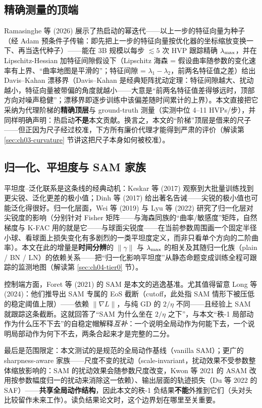 \subsection{精确测量的顶端}
\label{sec:ch02-exact}

Ramasinghe 等 (2026) 展示了热启动的幂迭代——以上一步的特征向量为种子（经 Adam
预条件子传输：即先把上一步的特征向量按优化器的坐标缩放变换一下、再当迭代种子）——能在 3B 规模以每步 $\lesssim 5$ 次 HVP 跟踪精确 $\lambda_{\max}$，并在
Lipschitz-Hessian 加特征间隙假设下（Lipschitz 海森 = 假设曲率随参数的变化速率有上界、“曲率地图是平滑的”；特征间隙 = $\lambda_1-\lambda_2$，前两名特征值之差）给出 Davis--Kahan
漂移界（Davis–Kahan 是经典矩阵扰动定理：特征间隙越大、扰动越小，特征向量被带偏的角度就越小——大意是“前两名特征值差得够远时，顶部方向对噪声稳健”；漂移界即逐步训练中该偏差随时间累计的上界）。本文直接把它采纳为代理阶梯的\textbf{精确顶层}与 ground-truth 测量（实测中位
4--11
HVPs/步），并同样明确声明：热启动\textbf{不是}本文贡献。换言之，本文的“阶梯”顶层是借来的尺子——但正因为尺子经过校准，下方所有廉价代理才能得到严肃的评价（解读第
\ref{sec:ch03-curvature} 节讲这把尺子本身如何被校准）。

\subsection{归一化、平坦度与 SAM 家族}
\label{sec:ch02-flatness}

平坦度--泛化联系是这条线的经典动机：Keskar 等 (2017)
观察到大批量训练找到更尖锐、泛化更差的极小值；Dinh 等 (2017)
给出著名告诫——尖锐的极小值也可能泛化得很好。归一化层面，Wei 等 (2019) 与 Lyu 等
(2022) 研究了归一化层对尖锐度的影响（分别针对 Fisher
矩阵——与海森同族的“曲率/敏感度”矩阵，自然梯度与 K-FAC 用的就是它——与球面尖锐度——在当前参数周围画一个固定半径小球、看球面上损失变化有多剧烈的一类平坦度定义，而非只看单个方向的二阶曲率）。本文在此的增量是\textbf{时间分辨}的 $\|\gamma\|$ 与 $\lambda_{\max}$
的相关及其随归一化族（plain / BN /
LN）的依赖关系——把“归一化影响平坦度”从静态命题变成训练全程可跟踪的监测地图（解读第
\ref{sec:ch04-tier0} 节）。

控制端方面，Foret 等 (2021) 的 SAM 是本文的逃逸基准。尤其值得留意 Long 等
(2024)：他们推导出 SAM 专属的 EoS 截断（cutoff，此处指 SAM 情形下被压低的稳定阈值上限）——依赖 $\|\nabla L\|$，与纯 GD 的 $2/\eta$
不同——且经验上 SAM 就跟踪这条截断。这就回答了“SAM 为什么坐在 $2/\eta$
之下”，与本文“秩-1
局部动作为什么压不下去”的自稳定帽解释\emph{互补}：一个说明全局动作为何能下去，一个说明局部动作为何下不去，两条合起来才是完整的二分。

最后是范围限定：本文测试的是规范的全局动作基线（vanilla SAM）；更广的
sharpness-aware 家族——尺度不变的扰动（scale-invariant，扰动效果不受参数整体缩放影响的：SAM 的扰动效果会随参数尺度改变，Kwon 等 2021 的 ASAM 改用按参数幅度归一的扰动来消除这一依赖）、输出层面的轨迹损失（Du
等 2022 的 SAF）——\textbf{共享全局动作结构}，因此本文的秩-1
负结果\textbf{不能}外推到它们（头对头比较留作未来工作）。读负结果论文时，这个边界划在哪里至关重要。

